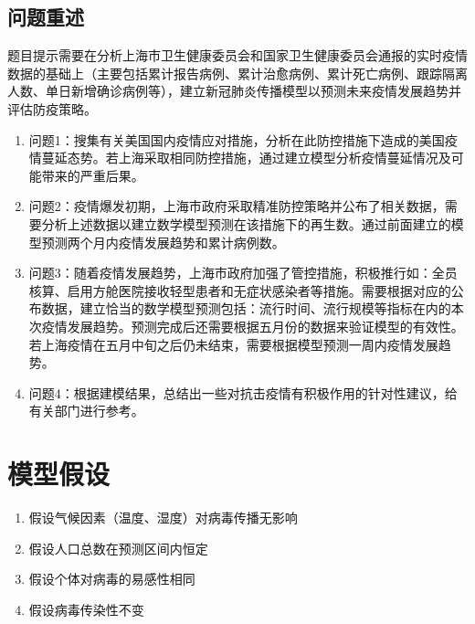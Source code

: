 \documentclass[bwprint]{gmcmthesis}
\numberwithin{figure}{section}
\begin{document}
\subsection{问题重述}
题目提示需要在分析上海市卫生健康委员会和国家卫生健康委员会通报的实时疫情数据的基础上（主要包括累计报告病例、累计治愈病例、累计死亡病例、跟踪隔离人数、单日新增确诊病例等），建立新冠肺炎传播模型以预测未来疫情发展趋势并评估防疫策略。
\begin{enumerate}
\item
问题1：搜集有关美国国内疫情应对措施，分析在此防控措施下造成的美国疫情蔓延态势。若上海采取相同防控措施，通过建立模型分析疫情蔓延情况及可能带来的严重后果。
\item 问题2：疫情爆发初期，上海市政府采取精准防控策略并公布了相关数据，需要分析上述数据以建立数学模型预测在该措施下的再生数。通过前面建立的模型预测两个月内疫情发展趋势和累计病例数。
\item 问题3：随着疫情发展趋势，上海市政府加强了管控措施，积极推行如：全员核算、启用方舱医院接收轻型患者和无症状感染者等措施。需要根据对应的公布数据，建立恰当的数学模型预测包括：流行时间、流行规模等指标在内的本次疫情发展趋势。预测完成后还需要根据五月份的数据来验证模型的有效性。若上海疫情在五月中旬之后仍未结束，需要根据模型预测一周内疫情发展趋势。
\item 问题4：根据建模结果，总结出一些对抗击疫情有积极作用的针对性建议，给有关部门进行参考。
\end{enumerate}



\section{模型假设}
\begin{enumerate}
\item 假设气候因素（温度、湿度）对病毒传播无影响
\item 假设人口总数在预测区间内恒定
\item 假设个体对病毒的易感性相同
\item 假设病毒传染性不变
\end{enumerate}
\end{document}
